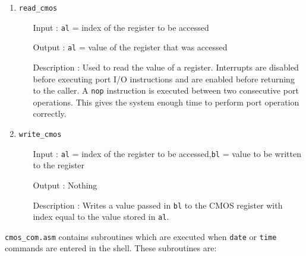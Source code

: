 \begin{enumerate}
  \item \texttt{read\_cmos}
  		\begin{enumerate}[align=parleft, labelsep=2cm, leftmargin=1.06in]
  		  \item[Input]: \texttt{al} = index of the register to be accessed
  		  \item[Output]: \texttt{al} = value of the register that was accessed
  		  \item[Description]: Used to read the value of a register. Interrupts are disabled before executing port I/O instructions and are enabled before returning to the caller. A \texttt{nop} instruction is executed between two consecutive port operations. This gives the system enough time to perform port operation correctly.
  		\end{enumerate}
  \item \texttt{write\_cmos}
  		\begin{enumerate}[align=parleft, labelsep=2cm, leftmargin=1.06in]
  		  \item[Input]: \texttt{al} = index of the register to be accessed,\newline\texttt{bl} = value to be written to the register
  		  \item[Output]: Nothing
  		  \item[Description]: Writes a value passed in \texttt{bl} to the CMOS register with index equal to the value stored in \texttt{al}.
  		\end{enumerate}
\end{enumerate}
\texttt{cmos\_com.asm} contains subroutines which are executed when \texttt{date} or \texttt{time} commands are entered in the shell. These subroutines are:
